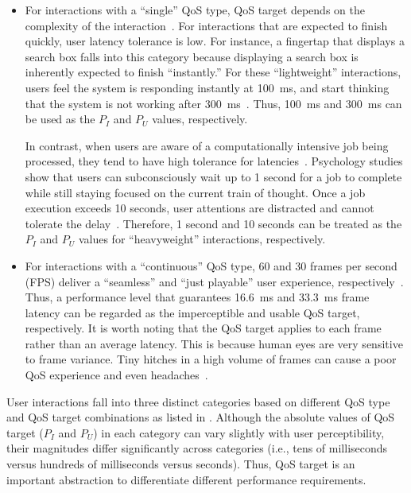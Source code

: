 \begin{itemize}
\item For interactions with a ``single'' QoS type, QoS target depends on the complexity of the interaction~\cite{eventlatency}. For interactions that are expected to finish quickly, user latency tolerance is low. For instance, a fingertap that displays a search box falls into this category because displaying a search box is inherently expected to finish ``instantly.'' For these ``lightweight'' interactions, users feel the system is responding instantly at 100~ms, and start thinking that the system is not working after 300~ms~\cite{humanperception}. Thus, 100~ms and 300~ms can be used as the $P_I$ and $P_U$ values, respectively.

In contrast, when users are aware of a computationally intensive job being processed, they tend to have high tolerance for latencies~\cite{usability_engineering}. Psychology studies show that users can subconsciously wait up to 1 second for a job to complete while still staying focused on the current train of thought. Once a job execution exceeds 10 seconds, user attentions are distracted and cannot tolerate the delay~\cite{info_vis, response_time}. Therefore, 1 second and 10 seconds can be treated as the $P_I$ and $P_U$ values for ``heavyweight'' interactions, respectively.

\item For interactions with a ``continuous'' QoS type, 60 and 30 frames per second (FPS) deliver a ``seamless'' and ``just playable'' user experience, respectively~\cite{fps_target}. Thus, a performance level that guarantees 16.6~ms and 33.3~ms frame latency can be regarded as the imperceptible and usable QoS target, respectively. It is worth noting that the QoS target applies to each frame rather than an average latency. This is because human eyes are very sensitive to frame variance. Tiny hitches in a high volume of frames can cause a poor QoS experience and even headaches~\cite{jankbusting, adaptivevsync}.
\end{itemize}

User interactions fall into three distinct categories based on different QoS type and QoS target combinations as listed in . Although the absolute values of QoS target ($P_I$ and $P_U$) in each category can vary slightly with user perceptibility, their magnitudes differ significantly across categories (i.e., tens of milliseconds versus hundreds of milliseconds versus seconds). Thus, QoS target is an important abstraction to differentiate different performance requirements.

